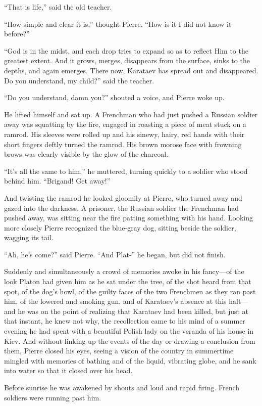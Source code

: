 ``That is life,'' said the old teacher.

``How simple and clear it is,'' thought Pierre. ``How is it I did
not know it before?''

``God is in the midst, and each drop tries to expand so as to
reflect Him to the greatest extent. And it grows, merges,
disappears from the surface, sinks to the depths, and again
emerges. There now, Karataev has spread out and disappeared. Do
you understand, my child?'' said the teacher.

``Do you understand, damn you?'' shouted a voice, and Pierre woke
up.

He lifted himself and sat up. A Frenchman who had just pushed a
Russian soldier away was squatting by the fire, engaged in
roasting a piece of meat stuck on a ramrod. His sleeves were
rolled up and his sinewy, hairy, red hands with their short
fingers deftly turned the ramrod. His brown morose face with
frowning brows was clearly visible by the glow of the charcoal.

``It's all the same to him,'' he muttered, turning quickly to a
soldier who stood behind him. ``Brigand! Get away!''

And twisting the ramrod he looked gloomily at Pierre, who turned
away and gazed into the darkness. A prisoner, the Russian soldier
the Frenchman had pushed away, was sitting near the fire patting
something with his hand. Looking more closely Pierre recognized
the blue-gray dog, sitting beside the soldier, wagging its tail.

``Ah, he's come?'' said Pierre. ``And Plat-'' he began, but did
not finish.

Suddenly and simultaneously a crowd of memories awoke in his
fancy---of the look Platon had given him as he sat under the
tree, of the shot heard from that spot, of the dog's howl, of the
guilty faces of the two Frenchmen as they ran past him, of the
lowered and smoking gun, and of Karataev's absence at this
halt---and he was on the point of realizing that Karataev had
been killed, but just at that instant, he knew not why, the
recollection came to his mind of a summer evening he had spent
with a beautiful Polish lady on the veranda of his house in
Kiev. And without linking up the events of the day or drawing a
conclusion from them, Pierre closed his eyes, seeing a vision of
the country in summertime mingled with memories of bathing and of
the liquid, vibrating globe, and he sank into water so that it
closed over his head.

Before sunrise he was awakened by shouts and loud and rapid
firing.  French soldiers were running past him.

